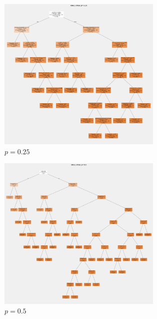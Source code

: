 \documentclass[a4paper,12pt]{article}
\begin{document}
\begin{figure}[H]
    \centering
    \includegraphics[width=0.7\textwidth]{Tree3.png} 
    \caption{$p=0.25$}
\end{figure}

\begin{figure}[H]
    \centering
    \includegraphics[width=0.7\textwidth]{Tree4.png}   
     \caption{$p=0.5$}
\end{figure}

\newpage
\nocite{*}


\end{document}
